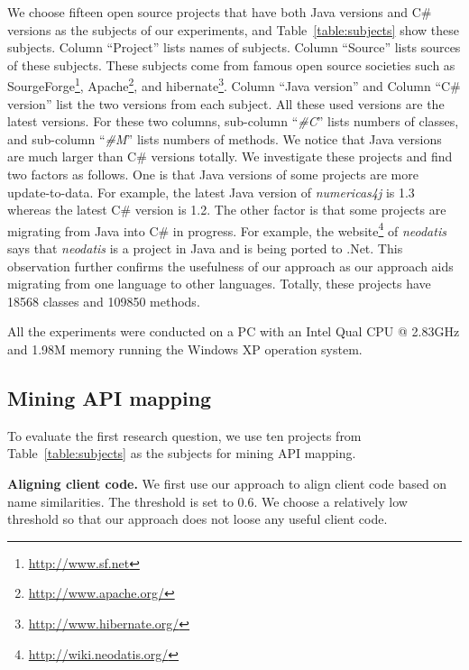 We choose fifteen open source projects that have both Java versions
and C\# versions as the subjects of our experiments, and
Table~\ref{table:subjects} show these subjects. Column ``Project''
lists names of subjects. Column ``Source'' lists sources of these
subjects. These subjects come from famous open source societies such
as SourgeForge\footnote{\url{http://www.sf.net}},
Apache\footnote{\url{http://www.apache.org/}}, and
hibernate\footnote{\url{http://www.hibernate.org/}}. Column ``Java
version'' and Column ``C\# version'' list the two versions from each
subject. All these used versions are the latest versions. For these
two columns, sub-column ``\emph{\#C}'' lists numbers of classes, and
sub-column ``\emph{\#M}'' lists numbers of methods. We notice that
Java versions are much larger than C\# versions totally. We
investigate these projects and find two factors as follows. One is
that Java versions of some projects are more update-to-data. For
example, the latest Java version of \emph{numericas4j} is 1.3
whereas the latest C\# version is 1.2. The other factor is that some
projects are migrating from Java into C\# in progress. For example,
the website\footnote{\url{http://wiki.neodatis.org/}} of
\emph{neodatis} says that \emph{neodatis} is a project in Java and
is being ported to .Net. This observation further confirms the
usefulness of our approach as our approach aids migrating from one
language to other languages. Totally, these projects have 18568
classes and 109850 methods.

All the experiments were conducted on a PC with an Intel Qual CPU @
2.83GHz and 1.98M memory running the Windows XP operation system.
\subsection{Mining API mapping}
\label{sec:experiment:mining}

To evaluate the first research question, we use ten projects from
Table~\ref{table:subjects} as the subjects for mining API mapping.


\textbf{Aligning client code.} We first use our approach to align
client code based on name similarities. The threshold is set to 0.6.
We choose a relatively low threshold so that our approach does not
loose any useful client code.

